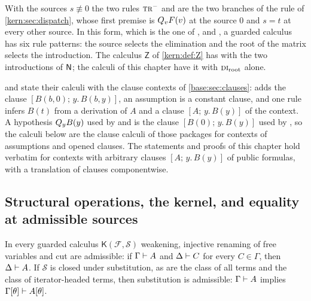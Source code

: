 \begin{remark}
\label{guard:rem:se}
With the sources $s\not\equiv 0$ the two rules $\rulename{Tr}^{-}$ and
 are the two branches of the rule  of
\cref{kern:sec:dispatch}, whose first premise is $Q_{v}F(v)$ at the source
$0$ and $s=t$ at every other source.  In this form, which is the one of
,  and
, a guarded calculus has six rule patterns:
the source selects the elimination and the root of the matrix selects the
introduction.  The calculus $\mathsf Z$ of \cref{kern:def:Z} has
 with the two introductions of $\mathsf{N}$; the calculi of this
chapter have it with $\rulename{DI}_{\mathrm{root}}$ alone.
\end{remark}

\begin{remark}
\label{guard:rem:clauses}
 and  state their calculi with the
clause contexts of \cref{base:sec:clauses}:  adds the clause
$[B(b,0);\,y.\,B(b,y)]$, an assumption is a constant clause, and one rule
 infers $B(t)$ from a derivation of $A$ and a clause
$[A;\,y.\,B(y)]$ of the context.  A hypothesis $Q_{y}B(y)$ used by
 and  is the clause $[B(0);\,y.\,B(y)]$ used by
, so the calculi below are the clause calculi of those
packages for contexts of assumptions and opened clauses.  The statements and
proofs of this chapter hold verbatim for contexts with arbitrary clauses
$[A;\,y.\,B(y)]$ of public formulas, with a translation of clauses
componentwise.
\end{remark}

\subsection{Structural operations, the kernel, and equality at admissible
sources}

\begin{lemma}
\label{guard:lem:struct}
In every guarded calculus $\mathsf K(\mathcal F,\mathcal S)$ weakening,
injective renaming of free variables and cut are admissible: if
$\Gamma\vdash A$ and $\Delta\vdash C$ for every $C\in\Gamma$, then
$\Delta\vdash A$.  If $\mathcal S$ is closed under substitution, as are the
class of all terms and the class of iterator-headed terms, then substitution
is admissible: $\Gamma\vdash A$ implies
$\Gamma[\theta]\vdash A[\theta]$.
\end{lemma}

